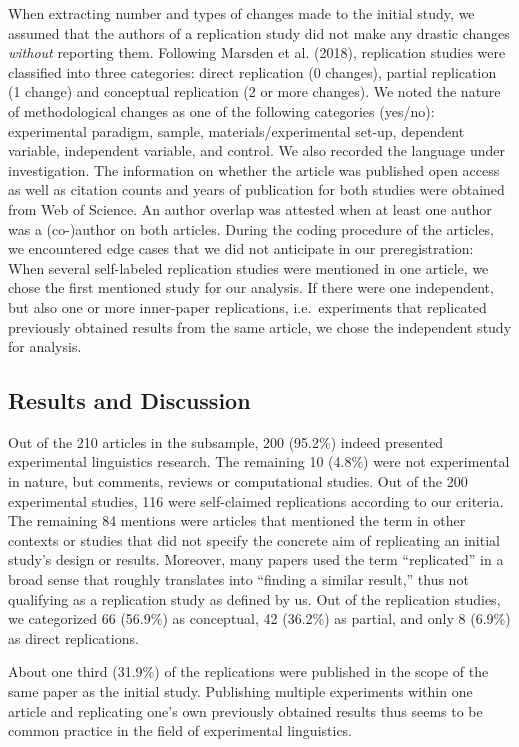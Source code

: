 \documentclass[]{elsarticle} %
\begin{document}
When extracting number and types of changes made to the initial study, we assumed that the authors of a replication study did not make any drastic changes \emph{without} reporting them.
Following Marsden et al. (2018), replication studies were classified into three categories: direct replication (0 changes), partial replication (1 change) and conceptual replication (2 or more changes).
We noted the nature of methodological changes as one of the following categories (yes/no):
experimental paradigm, sample, materials/experimental set-up, dependent variable, independent variable, and control.
We also recorded the language under investigation.
The information on whether the article was published open access as well as citation counts and years of publication for both studies were obtained from Web of Science.
An author overlap was attested when at least one author was a (co-)author on both articles.
During the coding procedure of the articles, we encountered edge cases that we did not anticipate in our preregistration: When several self-labeled replication studies were mentioned in one article, we chose the first mentioned study for our analysis. If there were one independent, but also one or more inner-paper replications, i.e.~experiments that replicated previously obtained results from the same article, we chose the independent study for analysis.

\hypertarget{results-and-discussion-1}{%
\subsection{Results and Discussion}\label{results-and-discussion-1}}

Out of the 210 articles in the subsample, 200 (95.2\%) indeed presented experimental linguistics research. The remaining 10 (4.8\%) were not experimental in nature, but comments, reviews or computational studies. Out of the 200 experimental studies, 116 were self-claimed replications according to our criteria. The remaining 84 mentions were articles that mentioned the term in other contexts or studies that did not specify the concrete aim of replicating an initial study's design or results. Moreover, many papers used the term ``replicated'' in a broad sense that roughly translates into ``finding a similar result,'' thus not qualifying as a replication study as defined by us.
Out of the replication studies, we categorized 66 (56.9\%) as conceptual, 42 (36.2\%) as partial, and only 8 (6.9\%) as direct replications.

About one third (31.9\%) of the replications were published in the scope of the same paper as the initial study. Publishing multiple experiments within one article and replicating one's own previously obtained results thus seems to be common practice in the field of experimental linguistics.
\end{document}
